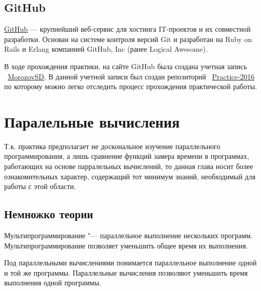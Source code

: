 \documentclass{article}
\begin{document}
		\subsection{GitHub}
			\href{https://github.com/}{GitHub} — крупнейший веб-сервис для хостинга IT-проектов и их совместной разработки. 				Основан на системе контроля	версий Git и разработан на Ruby on Rails и Erlang компанией GitHub, Inc (ранее Logical 					Awesome).
			
			В ходе прохождения практики, на сайте GitHub была создана учетная запись ~\href{https://github.com/MorozovSD}					{MorozovSD}. В данной учетной записи был создан репозиторий ~\href{https://github.com/MorozovSD/Practice-2016}						{Practice-2016} по которому можно легко отследить процесс прохождения практической работы.
	\newpage
	\section{Паралельные вычисления}
		Т.к. практика предполагает не доскональное изучение параллельного программирования, а лишь сравнение функций замера 			времени в программах, работающих на основе парралельных вычислений, то данная глава носит более ознакомительных характер, 			содержащий тот минимум знаний, необходимый для работы с этой области.
		\subsection{Немножко теории}

	
			Мультипрограммирование "--- параллельное выполнение нескольких программ. Мультипрограммирование позволяет уменьшить 			общее время их выполнения.
			
			Под параллельными вычислениями понимается параллельное выполнение одной и той же программы. Параллельные вычисления 			позволяют уменьшить время выполнения одной программы.
			
\end{document}
